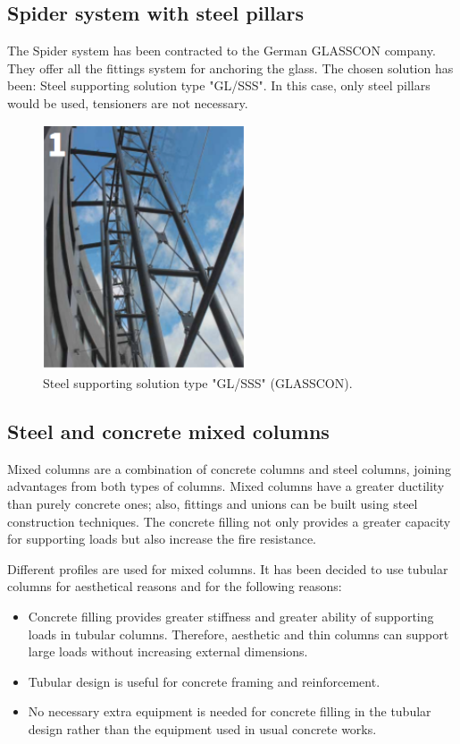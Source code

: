 	
	
		\subsection{Spider system with steel pillars}
	The Spider system has been contracted to the German GLASSCON company. They offer all the fittings system for anchoring the glass. The chosen solution has been: Steel supporting solution type "GL/SSS". In this case, only steel pillars would be used, tensioners are not necessary.
	
	\begin{figure}[ht!]
\centering
\includegraphics[width=6cm]{./images/Facade/steel}
\caption{Steel supporting solution type "GL/SSS" (GLASSCON).}
\end{figure}
	
		\subsection{Steel and concrete mixed columns}
	Mixed columns are a combination of concrete columns and steel columns, joining advantages from both types of columns. Mixed columns have a greater ductility than purely concrete ones; also, fittings and unions can be built using steel construction techniques. The concrete filling not only provides a greater capacity for supporting loads but also increase the fire resistance.
	
	Different profiles are used for mixed columns. It has been decided to use tubular columns for aesthetical reasons and for the following reasons:
	
\begin{itemize}
\item Concrete filling provides greater stiffness and greater ability of supporting loads in tubular columns. Therefore, aesthetic and thin columns can support large loads without increasing external dimensions.
\item Tubular design is useful for concrete framing and reinforcement.
\item No necessary extra equipment is needed for concrete filling in the tubular design rather than the equipment used in usual concrete works.
\end{itemize}
	
